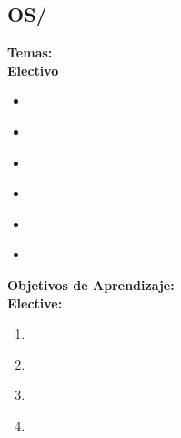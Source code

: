 \subsection{OS/\OSVirtualMachines}\label{sec:BOK:OSVirtualMachines}
\noindent \textbf{Temas:}\\
\noindent \textbf{Electivo}
\begin{itemize}
	\item \OSVirtualMachinesTopicTypes\label{sec:BOK:OSVirtualMachinesTopicTypes}
	\item \OSVirtualMachinesTopicPaging\label{sec:BOK:OSVirtualMachinesTopicPaging}
	\item \OSVirtualMachinesTopicVirtual\label{sec:BOK:OSVirtualMachinesTopicVirtual}
	\item \OSVirtualMachinesTopicHypervisors\label{sec:BOK:OSVirtualMachinesTopicHypervisors}
	\item \OSVirtualMachinesTopicPortable\label{sec:BOK:OSVirtualMachinesTopicPortable}
	\item \OSVirtualMachinesTopicCost\label{sec:BOK:OSVirtualMachinesTopicCost}
\end{itemize}


\noindent \textbf{Objetivos de Aprendizaje:}\\
\noindent \textbf{Elective:}
\begin{enumerate}
	\setcounter{enumi}{0}
	\item \OSVirtualMachinesLOExplainTheVirtual\xspace[\OSVirtualMachinesLOExplainTheVirtualLevel]\label{sec:BOK:OSVirtualMachinesLOExplainTheVirtual}
	\item \OSVirtualMachinesLODifferentiateEmulation\xspace[\OSVirtualMachinesLODifferentiateEmulationLevel]\label{sec:BOK:OSVirtualMachinesLODifferentiateEmulation}
	\item \OSVirtualMachinesLOEvaluateVirtualization\xspace[\OSVirtualMachinesLOEvaluateVirtualizationLevel]\label{sec:BOK:OSVirtualMachinesLOEvaluateVirtualization}
	\item \OSVirtualMachinesLODiscussHypervisors\xspace[\OSVirtualMachinesLODiscussHypervisorsLevel]\label{sec:BOK:OSVirtualMachinesLODiscussHypervisors}
\end{enumerate}


